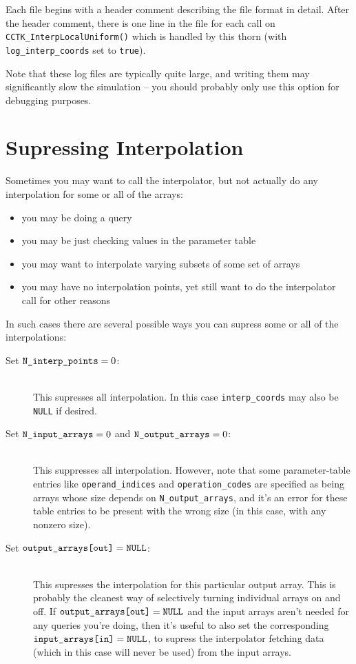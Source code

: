 Each file begins with a header comment describing the file format in
detail.  After the header comment, there is one line in the file for
each call on \verb|CCTK_InterpLocalUniform()| which is handled by this thorn
(with \verb|log_interp_coords| set to \verb|true|).

Note that these log files are typically quite large, and writing them         
may significantly slow the simulation -- you should probably only use
this option for debugging purposes.


\section{Supressing Interpolation}

Sometimes you may want to call the interpolator, but not actually
do any interpolation for some or all of the arrays:
\begin{itemize}
\item	you may be doing a query
\item	you may be just checking values in the parameter table
\item	you may want to interpolate varying subsets of some set
	of arrays
\item	you may have no interpolation points, yet still want to
	do the interpolator call for other reasons
\end{itemize}

In such cases there are several possible ways you can supress some
or all of the interpolations:
\begin{description}
\item[
      Set $\text{\tt N\_interp\_points} = 0$:]\mbox{}\\
	This supresses all interpolation.  In this case
	\verb|interp_coords| may also be \verb|NULL| if desired.
\item[
      Set $\text{\tt N\_input\_arrays} = 0$ and
      $\text{\tt N\_output\_arrays} = 0$:]\mbox{}\\
	This suppresses all interpolation.  However, note that
	some parameter-table entries like \verb|operand_indices|
	and \verb|operation_codes| are specified as being arrays
	whose size depends on \verb|N_output_arrays|, and it's an
	error for these table entries to be present with the wrong
	size (in this case, with any nonzero size).
\item[
      Set $\text{\tt output\_arrays[out]} = \text{\tt NULL}$:]\mbox{}\\
	This supresses the interpolation for this particular
	output array.  This is probably the cleanest way of
	selectively turning individual arrays on and off.
	If $\verb|output_arrays[out]| = \verb|NULL|$ and
	the input arrays aren't needed for any queries you're doing,
	then it's useful to also set the corresponding
	$\verb|input_arrays[in]| = \verb|NULL|$, to supress the
	interpolator fetching data (which in this case will never be used)
	from the input arrays.
\end{description}

